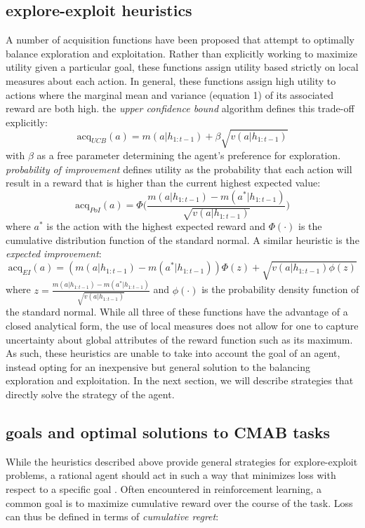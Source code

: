 \documentclass[10pt,letterpaper]{article}
\begin{document}
	\subsection{explore-exploit heuristics}
	A number of acquisition functions have been proposed that attempt to optimally balance exploration and exploitation. Rather than explicitly working to maximize utility given a particular goal, these functions assign utility based strictly on local measures about each action. In general, these functions assign high utility to actions where the marginal mean and variance (equation 1) of its associated reward are both high. the \textit{upper confidence bound} \citep{krause} algorithm defines this trade-off explicitly:
	$$\text{acq}_{UCB}(a) = m(a|h_{1:t-1}) + \beta \sqrt{v(a|h_{1:t-1})}$$
	with $\beta$ as a free parameter determining the agent's preference for exploration. 	\textit{probability of improvement} \citep{Kushner1963} defines utility as the probability that each action will result in a reward that is higher than the current highest expected value:
	$$\text{acq}_{PoI}(a) = \Phi \bigg( \frac{m(a|h_{1:t-1}) -  m(a^{*}|h_{1:t-1})}{\sqrt{v(a|h_{1:t-1})}} \bigg)$$
	where $a^{*}$ is the action with the highest expected reward and $\Phi(\cdot)$ is the cumulative distribution function of the standard normal. A similar heuristic is the \textit{expected improvement}:
	$$\text{acq}_{EI}(a) = (m(a|h_{1:t-1}) -  m(a^{*}|h_{1:t-1})) \Phi(z) + \sqrt{v(a|h_{1:t-1}) \phi(z)}$$
	where $z = \frac{m(a|h_{1:t-1}) -  m(a^{*}|h_{1:t-1})}{\sqrt{v(a|h_{1:t-1})}}$ and $\phi(\cdot)$ is the probability density function of the standard normal. While all three of these functions have the advantage of a closed analytical form, the use of local measures does not allow for one to capture uncertainty about global attributes of the reward function such as its maximum. As such, these heuristics are unable to take into account the goal of an agent, instead opting for an inexpensive but general solution to the balancing exploration and exploitation. In the next section, we will describe strategies that directly solve the strategy of the agent.
	
	\subsection{goals and optimal solutions to CMAB tasks}
	While the heuristics described above provide general strategies for explore-exploit problems, a rational agent should act in such a way that minimizes loss with respect to a specific goal \citep{anderson}. Often encountered in reinforcement learning, a common goal is to maximize cumulative reward over the course of the task. Loss can thus be defined in terms of \textit{cumulative regret}:
	
\end{document}

